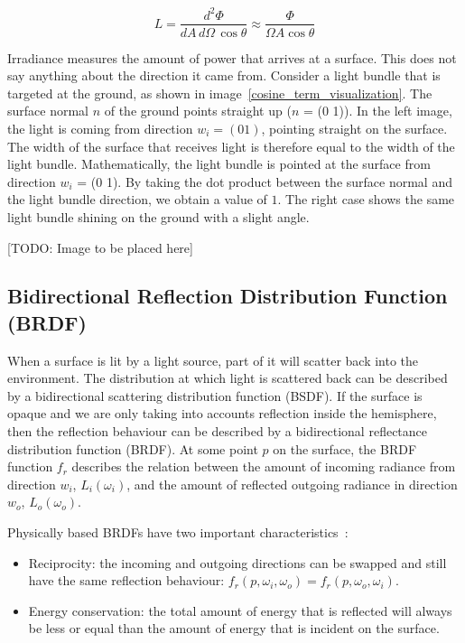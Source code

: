 \documentclass[11pt,a4paper]{report}
\begin{document}
\begin{equation}
L = \frac{d^2 \Phi}{dA\, d\Omega\, \cos \theta} \approx \frac{\Phi}{\Omega A \cos \theta}
\end{equation}

Irradiance measures the amount of power that arrives at a surface. This does not say anything about the direction it came from. Consider a light bundle that is targeted at the ground, as shown in image~\ref{cosine_term_visualization}. The surface normal $n$ of the ground points straight up ($n$ = (0 1)). In the left image, the light is coming from direction $w_i = (0 1)$, pointing straight on the surface. The width of the surface that receives light is therefore equal to the width of the light bundle. Mathematically, the light bundle is pointed at the surface from direction $w_i$ = (0 1). By taking the dot product between the surface normal and the light bundle direction, we obtain a value of $1$. The right case shows the same light bundle shining on the ground with a slight angle.

[TODO: Image to be placed here]

\subsection{Bidirectional Reflection Distribution Function (BRDF)}

When a surface is lit by a light source, part of it will scatter back into the environment. The distribution at which light is scattered back can be described by a bidirectional scattering distribution function (BSDF). If the surface is opaque and we are only taking into accounts reflection inside the hemisphere, then the reflection behaviour can be described by a bidirectional reflectance distribution function (BRDF). At some point $p$ on the surface, the BRDF function $f_r$ describes the relation between the amount of incoming radiance from direction $w_i$, $L_i(\omega_i)$, and the amount of reflected outgoing radiance in direction $w_o$, $L_o(\omega_o)$.

Physically based BRDFs have two important characteristics~\cite{pbrt}:

\begin{itemize}
\item Reciprocity: the incoming and outgoing directions can be swapped and still have the same reflection behaviour: $f_r(p, \omega_i, \omega_o) = f_r(p, \omega_o, \omega_i)$.
\item Energy conservation: the total amount of energy that is reflected will always be less or equal than the amount of energy that is incident on the surface.
\end{itemize}
\end{document}
